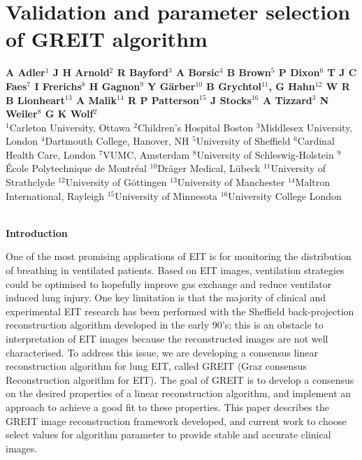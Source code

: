 \documentclass[12pt]{article}
\newcommand{\mysection}[1]{
~\\ \noindent
{\bf \normalsize #1}
\vspace{1mm}
}
\begin{document}
\renewcommand\refname{}


\section*{%
Validation and parameter selection of GREIT algorithm
}

\begin{list}{}{\setlength\leftmargin{25mm}}
\item[]\raggedright
 \footnotesize
{\bf
        A Adler$^{1}$
        J H Arnold$^{2}$
        R Bayford$^{3}$
        A Borsic$^{4}$
        B Brown$^{5}$
        P Dixon$^{6}$
        T J C Faes$^{7}$
        I Frerichs$^{8}$
        H Gagnon$^{9}$
        Y G\"arber$^{10}$
        B Grychtol$^{11}$, 
        G Hahn$^{12}$
        W R B Lionheart$^{13}$
        A Malik$^{14}$
        R P Patterson$^{15}$
        J Stocks$^{16}$
        A Tizzard$^{3}$
        N Weiler$^{8}$
        G K Wolf$^{2}$
}
\\
          $^{1}$Carleton University, Ottawa
          $^{2}$Children's Hospital Boston
          $^{3}$Middlesex University, London
          $^{4}$Dartmouth College, Hanover, NH
          $^{5}$University of Sheffield
          $^{6}$Cardinal Health Care, London
          $^{7}$VUMC, Amsterdam
          $^{8}$University of Schleswig-Holstein
          $^{9}$\'Ecole Polytechnique de Montr\'eal
         $^{10}$Dr\"ager Medical, L\"ubeck
         $^{11}$University of Strathclyde
         $^{12}$University of G\"ottingen
         $^{13}$University of Manchester
         $^{14}$Maltron International, Rayleigh
         $^{15}$University of Minnesota
         $^{16}$University College London
\end{list}

\vspace{-5mm}
\small
\mysection{Introduction}

One of the most promising applications of EIT is for
monitoring the distribution of breathing in ventilated
patients. Based on EIT images, ventilation strategies could
be optimised to hopefully improve gas exchange and reduce
ventilator induced lung injury. One key limitation is that
the majority of clinical and experimental EIT research
has been performed with the Sheffield back-projection
reconstruction algorithm developed in the early 90's; this
is an obstacle to interpretation of EIT images because
the reconstructed images are not well characterised. To
address this issue, we are developing a consensus linear
reconstruction algorithm for lung EIT, called GREIT (Graz
consensus Reconstruction algorithm for EIT).  The goal of
GREIT is to develop a consensus on the desired properties
of a linear reconstruction algorithm, and implement an
approach to achieve a good fit to these properties.
This paper describes the GREIT image reconstruction
framework developed, and
current work to choose select values for
algorithm parameter to provide stable and 
accurate clinical images.
\end{document}
